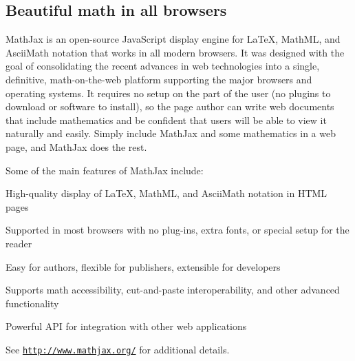\subsection*{Beautiful math in all browsers}

Math\-Jax is an open-\/source Java\-Script display engine for La\-Te\-X, Math\-M\-L, and Ascii\-Math notation that works in all modern browsers. It was designed with the goal of consolidating the recent advances in web technologies into a single, definitive, math-\/on-\/the-\/web platform supporting the major browsers and operating systems. It requires no setup on the part of the user (no plugins to download or software to install), so the page author can write web documents that include mathematics and be confident that users will be able to view it naturally and easily. Simply include Math\-Jax and some mathematics in a web page, and Math\-Jax does the rest.

Some of the main features of Math\-Jax include\-:


\begin{DoxyItemize}
\item High-\/quality display of La\-Te\-X, Math\-M\-L, and Ascii\-Math notation in H\-T\-M\-L pages
\end{DoxyItemize}


\begin{DoxyItemize}
\item Supported in most browsers with no plug-\/ins, extra fonts, or special setup for the reader
\end{DoxyItemize}


\begin{DoxyItemize}
\item Easy for authors, flexible for publishers, extensible for developers
\end{DoxyItemize}


\begin{DoxyItemize}
\item Supports math accessibility, cut-\/and-\/paste interoperability, and other advanced functionality
\end{DoxyItemize}


\begin{DoxyItemize}
\item Powerful A\-P\-I for integration with other web applications
\end{DoxyItemize}

See \href{http://www.mathjax.org/}{\tt http\-://www.\-mathjax.\-org/} for additional details.

